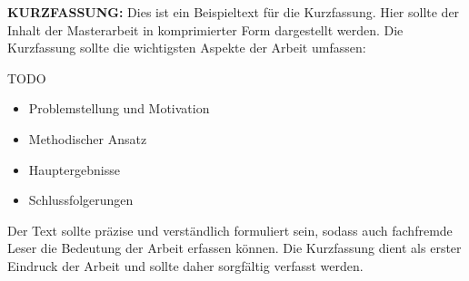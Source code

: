 

\textbf{KURZFASSUNG:} Dies ist ein Beispieltext für die Kurzfassung. Hier sollte der Inhalt der Masterarbeit in komprimierter
Form dargestellt werden. Die Kurzfassung sollte die wichtigsten Aspekte der Arbeit umfassen:

TODO

\begin{itemize}[leftmargin=0.63cm, label=\textbullet]
    \item Problemstellung und Motivation
    \item Methodischer Ansatz
    \item Hauptergebnisse
    \item Schlussfolgerungen
\end{itemize}

Der Text sollte präzise und verständlich formuliert sein, sodass auch fachfremde Leser die Bedeutung der
Arbeit erfassen können. Die Kurzfassung dient als erster Eindruck der Arbeit und sollte daher sorgfältig verfasst werden.



\clearpage